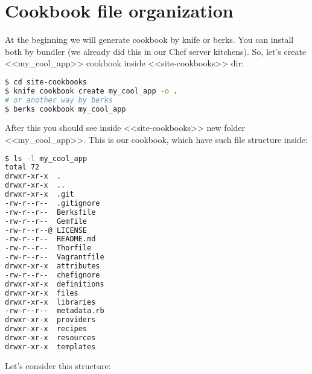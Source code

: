 \section{Cookbook file organization}
\label{sec:cookbook-files}

At the beginning we will generate cookbook by knife or berks. You can install both by bundler (we already did this in our Chef server kitchens). So, let's create <<my\_cool\_app>> cookbook inside <<site-cookbooks>> dir:

\begin{lstlisting}[language=Bash,label=lst:cookbook-organization1]
$ cd site-cookbooks
$ knife cookbook create my_cool_app -o .
# or another way by berks
$ berks cookbook my_cool_app
\end{lstlisting}

After this you should see inside <<site-cookbooks>> new folder <<my\_cool\_app>>. This is our cookbook, which have such file structure inside:

\begin{lstlisting}[language=Bash,label=lst:cookbook-organization2]
$ ls -l my_cool_app
total 72
drwxr-xr-x  .
drwxr-xr-x  ..
drwxr-xr-x  .git
-rw-r--r--  .gitignore
-rw-r--r--  Berksfile
-rw-r--r--  Gemfile
-rw-r--r--@ LICENSE
-rw-r--r--  README.md
-rw-r--r--  Thorfile
-rw-r--r--  Vagrantfile
drwxr-xr-x  attributes
-rw-r--r--  chefignore
drwxr-xr-x  definitions
drwxr-xr-x  files
drwxr-xr-x  libraries
-rw-r--r--  metadata.rb
drwxr-xr-x  providers
drwxr-xr-x  recipes
drwxr-xr-x  resources
drwxr-xr-x  templates
\end{lstlisting}

Let's consider this structure:

